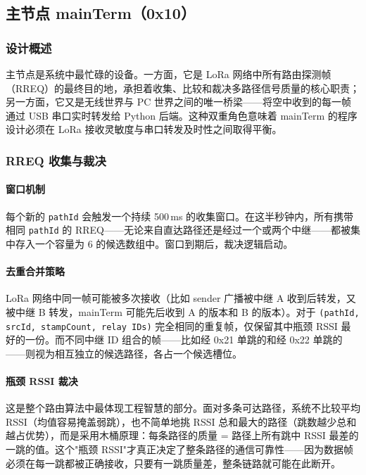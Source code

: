 \documentclass[12pt,a4paper]{ctexart}
\begin{document}
\subsection{主节点 mainTerm（0x10）}

\subsubsection{设计概述}

主节点是系统中最忙碌的设备。一方面，它是 LoRa 网络中所有路由探测帧（RREQ）的最终目的地，承担着收集、比较和裁决多路径信号质量的核心职责；另一方面，它又是无线世界与 PC 世界之间的唯一桥梁——将空中收到的每一帧通过 USB 串口实时转发给 Python 后端。这种双重角色意味着 mainTerm 的程序设计必须在 LoRa 接收灵敏度与串口转发及时性之间取得平衡。

\subsubsection{RREQ 收集与裁决}

\paragraph{窗口机制}
每个新的 \texttt{pathId} 会触发一个持续 500\,ms 的收集窗口。在这半秒钟内，所有携带相同 \texttt{pathId} 的 RREQ——无论来自直达路径还是经过一个或两个中继——都被集中存入一个容量为 6 的候选数组中。窗口到期后，裁决逻辑启动。

\paragraph{去重合并策略}
LoRa 网络中同一帧可能被多次接收（比如 sender 广播被中继 A 收到后转发，又被中继 B 转发，mainTerm 可能先后收到 A 的版本和 B 的版本）。对于 \texttt{(pathId, srcId, stampCount, relay IDs)} 完全相同的重复帧，仅保留其中瓶颈 RSSI 最好的一份。而不同中继 ID 组合的帧——比如经 0x21 单跳的和经 0x22 单跳的——则视为相互独立的候选路径，各占一个候选槽位。

\paragraph{瓶颈 RSSI 裁决}
这是整个路由算法中最体现工程智慧的部分。面对多条可达路径，系统不比较平均 RSSI（均值容易掩盖弱跳），也不简单地挑 RSSI 总和最大的路径（跳数越少总和越占优势），而是采用木桶原理：每条路径的质量 = 路径上所有跳中 RSSI 最差的一跳的值。这个"瓶颈 RSSI"才真正决定了整条路径的通信可靠性——因为数据帧必须在每一跳都被正确接收，只要有一跳质量差，整条链路就可能在此断开。
\end{document}
